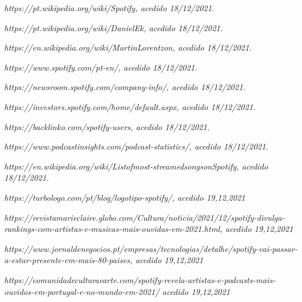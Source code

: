 \begin{thebibliography}{9}

\textit{https://pt.wikipedia.org/wiki/Spotify, acedido 18/12/2021.} 

\textit{https://pt.wikipedia.org/wiki/Daniel\textunderscore Ek, acedido 18/12/2021.}

\textit{https://en.wikipedia.org/wiki/Martin\textunderscore Lorentzon, acedido 18/12/2021.}

\textit{https://www.spotify.com/pt-en/, acedido 18/12/2021.}

\textit{https://newsroom.spotify.com/company-info/, acedido 18/12/2021.}

\textit{https://investors.spotify.com/home/default.aspx, acedido 18/12/2021.}

\textit{https://backlinko.com/spotify-users, acedido 18/12/2021.}

\textit{https://www.podcastinsights.com/podcast-statistics/, acedido 18/12/2021.}

\textit{https://en.wikipedia.org/wiki/List\textunderscore of\textunderscore most-streamedsongs\textunderscore on\textunderscore Spotify, acedido 18/12/2021.}

\textit{https://turbologo.com/pt/blog/logotipo-spotify/, acedido 19,12,2021}

\textit{https://revistamarieclaire.globo.com/Cultura/noticia/2021/12/spotify-divulga-rankings-com-artistas-e-musicas-mais-ouvidas-em-2021.html, acedido 19,12,2021}

\textit{https://www.jornaldenegocios.pt/empresas/tecnologias/detalhe/spotify-vai-passar-a-estar-presente-em-mais-80-paises, acedido 19,12,2021}

\textit{https://comunidadeculturaearte.com/spotify-revela-artistas-e-podcasts-mais-ouvidos-em-portugal-e-no-mundo-em-2021/
 acedido 19,12,2021}

\end{thebibliography}





